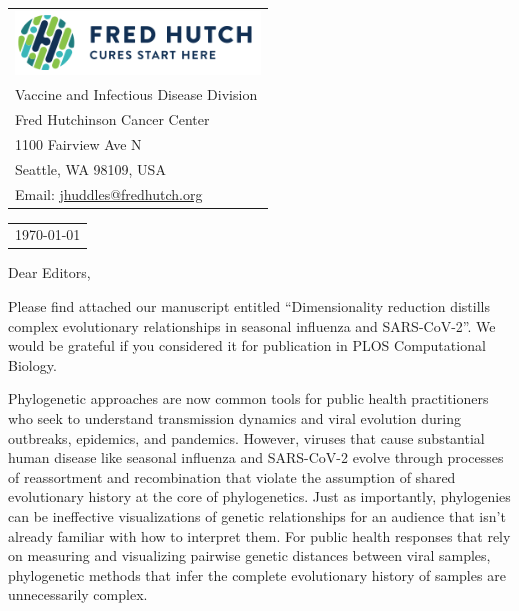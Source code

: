 \documentclass[11pt]{article}
\begin{document}
\thispagestyle{empty} %

\mbox{}\hfill
\begin{tabular}{l @{}}
	\includegraphics[width=6.5cm]{fhcc_logo} \\
	Vaccine and Infectious Disease Division \\
	Fred Hutchinson Cancer Center \\
	1100 Fairview Ave N \\
	Seattle, WA 98109, USA \\
	Email: \href{mailto:jhuddles@fredhutch.org}{jhuddles@fredhutch.org} \\
\end{tabular}

\vspace{0.1in} %

\begin{tabular}{@{} l}
  \today
\end{tabular}

\vspace{0.1in} %

Dear Editors,

\medskip %

Please find attached our manuscript entitled ``Dimensionality reduction distills complex evolutionary relationships in seasonal influenza and SARS-CoV-2''.
We would be grateful if you considered it for publication in PLOS Computational Biology.

Phylogenetic approaches are now common tools for public health practitioners who seek to understand transmission dynamics and viral evolution during outbreaks, epidemics, and pandemics.
However, viruses that cause substantial human disease like seasonal influenza and SARS-CoV-2 evolve through processes of reassortment and recombination that violate the assumption of shared evolutionary history at the core of phylogenetics.
Just as importantly, phylogenies can be ineffective visualizations of genetic relationships for an audience that isn't already familiar with how to interpret them.
For public health responses that rely on measuring and visualizing pairwise genetic distances between viral samples, phylogenetic methods that infer the complete evolutionary history of samples are unnecessarily complex.
\end{document}
